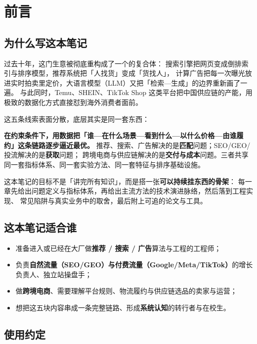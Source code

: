 \chapter*{前言}

\section*{为什么写这本笔记}

过去十年，这门生意被彻底重构成了一个的复合体：
搜索引擎把网页变成倒排索引与排序模型，推荐系统把「人找货」变成「货找人」，
计算广告把每一次曝光放进实时拍卖里定价，大语言模型（LLM）又把「检索—生成」的边界重新画了一遍。
与此同时，Temu、SHEIN、TikTok Shop 这类平台把中国供应链的产能，用极致的数据化方式直接怼到海外消费者面前。

这五条线索表面分散，底层其实是同一套东西：

\begin{keypoint}[一句话总纲]
\textbf{在约束条件下，用数据把「谁—在什么场景—看到什么—以什么价格—由谁履约」这条链路逐步逼近最优。}
推荐、搜索、广告解决的是\textbf{匹配}问题；SEO/GEO/投流解决的是\textbf{获取}问题；
跨境电商与供应链解决的是\textbf{交付与成本}问题。三者共享同一套指标体系、同一套实验方法、同一套特征与排序基础设施。
\end{keypoint}

这本笔记的目标不是「讲完所有知识」，而是搭一张\textbf{可以持续挂东西的骨架}：
每一章先给出问题定义与指标体系，再给出主流方法的技术演进脉络，然后落到工程实现、
常见陷阱与真实业务中的取舍，最后附上可追的论文与工具。

\section*{这本笔记适合谁}

\begin{itemize}
  \item 准备进入或已经在大厂做\textbf{推荐 / 搜索 / 广告}算法与工程的工程师；
  \item 负责\textbf{自然流量（SEO/GEO）与付费流量（Google/Meta/TikTok）}的增长负责人、独立站操盘手；
  \item 做\textbf{跨境电商}、需要理解平台规则、物流履约与供应链选品的卖家与运营；
  \item 想把这五块内容串成一条完整链路、形成\textbf{系统认知}的转行者与在校生。
\end{itemize}

\section*{使用约定}

